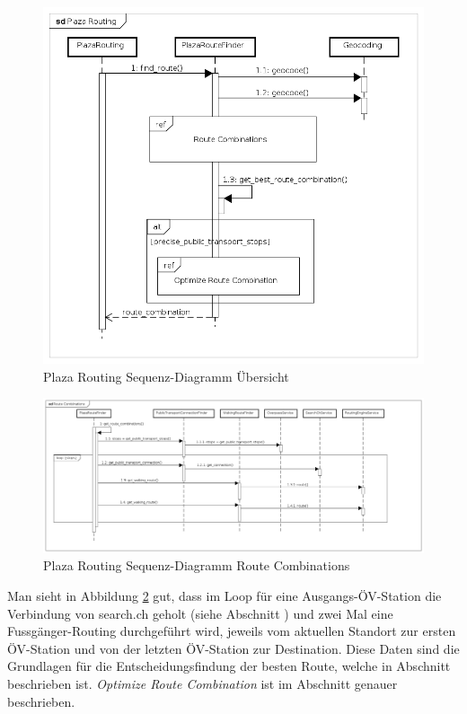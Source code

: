 \begin{figure}[ht]
    \centering
    \includegraphics[width=0.7\linewidth]{projectdoc/img/sequence_diagram_plaza_routing_overview}
    \caption[Plaza Routing Sequenz-Diagramm Übersicht]{Plaza Routing Sequenz-Diagramm Übersicht}
    \label{fig:sequence_diagram_plaza_routing_overview}
\end{figure}

\begin{figure}[ht]
    \centering
    \includegraphics[width=1\linewidth]{projectdoc/img/sequence_diagram_plaza_routing_route_comb}
    \caption[Plaza Routing Sequenz-Diagramm Route Combinations]{Plaza Routing Sequenz-Diagramm Route Combinations}
    \label{fig:sequence_diagram_plaza_routing_route_combs}
\end{figure}

Man sieht in Abbildung \ref{fig:sequence_diagram_plaza_routing_route_combs} gut, dass im Loop für eine Ausgangs-ÖV-Station die Verbindung von search.ch \cite{search_ch_route_api} geholt (siehe Abschnitt ) und zwei Mal eine Fussgänger-Routing durchgeführt wird, jeweils vom aktuellen Standort zur ersten ÖV-Station und von der letzten ÖV-Station zur Destination. Diese Daten sind die Grundlagen für die Entscheidungsfindung der besten Route, welche in Abschnitt  beschrieben ist. \emph{Optimize Route Combination} ist im Abschnitt  genauer beschrieben.

